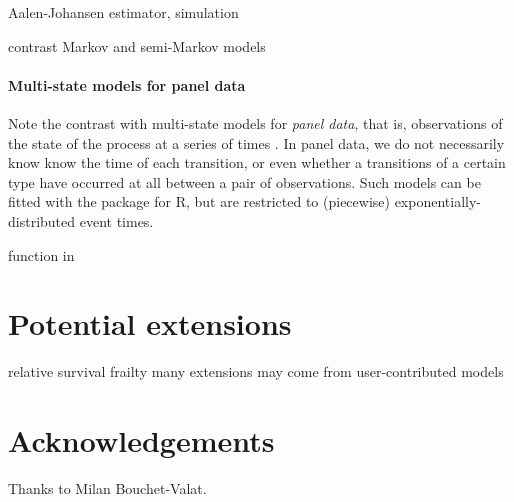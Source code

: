 \documentclass[nojss,nofooter]{jss}
\begin{document}
Aalen-Johansen estimator,  simulation

contrast Markov and semi-Markov models

\paragraph{Multi-state models for panel data}

Note the contrast with multi-state models for \emph{panel data}, that is,
observations of the state of the process at a series of times
\citep{kalbfleisch:lawless}.  In panel data, we do not necessarily
know know the time of each transition, or even whether a transitions
of a certain type have occurred at all between a pair of observations.
Such models can be fitted with the  package for R, but are
restricted to (piecewise) exponentially-distributed event times.



 function in  


\section{Potential extensions}

relative survival
frailty 
many extensions may come from user-contributed models


\appendix
\section{Acknowledgements}
Thanks to Milan Bouchet-Valat.


\end{document}
